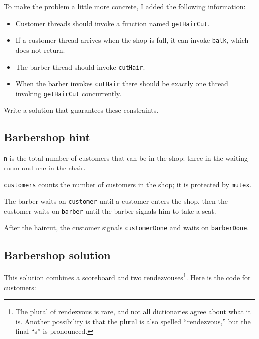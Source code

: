 \documentclass{book}
\newcommand{\clearemptydoublepage}{\newpage\cleardoublepage}
\begin{document}
To make the problem a little more concrete, I added the
following information:

\begin{itemize}

\item Customer threads should invoke a function named {\tt getHairCut}.

\item If a customer thread arrives when the shop is full, 
it can invoke {\tt balk}, which does not return.

\item The barber thread should invoke {\tt cutHair}.

\item When the barber invokes {\tt cutHair} there should
be exactly one thread invoking {\tt getHairCut} concurrently.

\end{itemize}

Write a solution that guarantees these constraints.


\clearemptydoublepage
\subsection{Barbershop hint}



{\tt n} is the total number of customers that can be in the shop:
three in the waiting room and one in the chair.

{\tt customers} counts the number of customers in the shop;
it is protected by {\tt mutex}.

The barber waits on {\tt customer} until a customer enters the
shop, then the customer waits on {\tt barber} until the barber
signals him to take a seat.

After the haircut, the customer signals {\tt customerDone} and
waits on {\tt barberDone}.

\clearemptydoublepage
\subsection{Barbershop solution}

This solution combines a scoreboard and two rendezvouses\footnote{The
  plural of rendezvous is rare, and not all dictionaries agree about
  what it is.  Another possibility is that the plural is also spelled
  ``rendezvous,'' but the final ``s'' is pronounced.}.  Here is the
code for customers:
\end{document}
